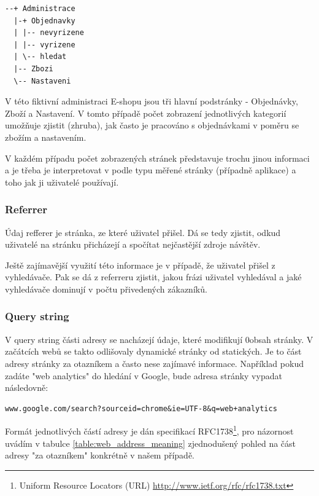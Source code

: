 \documentclass[bc,male,java,dept456]{diploma}						%
\begin{document}
\begin{lstlisting}[label=src:Plain,caption=Struktura administrace elekronického obchodu]
--+ Administrace
  |-+ Objednavky
  | |-- nevyrizene
  | |-- vyrizene
  | \-- hledat
  |-- Zbozi
  \-- Nastaveni
\end{lstlisting}

V této fiktivní administraci E-shopu jsou tři hlavní podstránky - Objednávky, Zboží a Nastavení. V tomto případě počet zobrazení jednotlivých kategorií umožňuje zjistit (zhruba), jak často je pracováno s objednávkami v poměru se zbožím a nastavením.

V každém případu počet zobrazených stránek představuje trochu jinou informaci a je třeba je interpretovat v podle typu měřené stránky (případně aplikace) a toho jak ji uživatelé používají.

\subsubsection{Referrer}

Údaj refferer je stránka, ze které uživatel přišel. Dá se tedy zjistit, odkud uživatelé na stránku přicházejí a spočítat nejčastější zdroje návštěv.

Ještě zajímavější využití této informace je v případě, že uživatel přišel z vyhledávače. Pak se dá z referreru zjistit, jakou frázi uživatel vyhledával a jaké vyhledávače dominují v počtu přivedených zákazníků.

\subsubsection{Query string}

V query string části adresy se nacházejí údaje, které modifikují 0obsah stránky. V začátcích webů se takto odlišovaly dynamické stránky od statických. Je to část adresy stránky za otazníkem a často nese zajímavé informace. Například pokud zadáte "web analytics" do hledání v Google, bude adresa stránky vypadat následovně:

\begin{lstlisting}[label=src:Plain,caption=Adresa ve vyhledávači pro dotaz web analytics, label=lala]
www.google.com/search?sourceid=chrome&ie=UTF-8&q=web+analytics
\end{lstlisting}

Formát jednotlivých částí adresy je dán specifikací RFC1738\footnote{Uniform Resource Locators (URL) \url{http://www.ietf.org/rfc/rfc1738.txt}}, pro názornost uvádím v tabulce \ref{table:web_address_meaning} zjednodušený pohled na část adresy "za otazníkem" konkrétně v našem případě.
\end{document}
